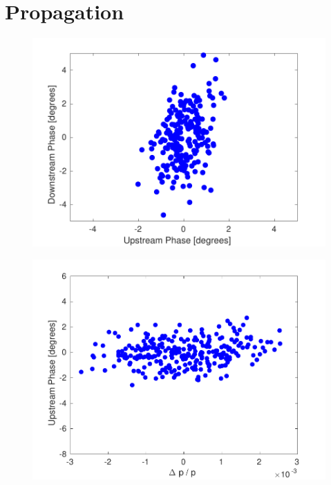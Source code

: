 \documentclass[%
 reprint,
 superscriptaddress,
 amsmath,
 amssymb,
 prstab,
]{revtex4-1}
\begin{document}
\section{\label{s:prop}Propagation}

\begin{figure}
	\includegraphics[width=\columnwidth]{figs/prop/origUpVsDown}%
	\caption{\label{f:origUpVsDown}
	}
\end{figure}

\begin{figure}
	\includegraphics[width=\columnwidth]{figs/prop/corrUpstreamEn}%
	\caption{\label{f:corrUpstreamEn}
	}
\end{figure}
\end{document}

